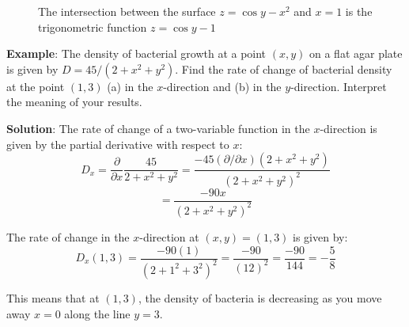 \begin{figure}[htbp]
    \centering
    \caption{The intersection between the surface $z = \cos{y} - x^2$ and 
    $x = 1$ is the trigonometric function $z = \cos{y} - 1$}
    \label{fig:ytangent}
\end{figure}

\textbf{Example}: The density of bacterial growth at a point $(x, y)$ on a 
flat agar plate is given by $D = 45/\left(2 + x^2 + y^2 \right)$. Find the 
rate of change of bacterial density at the point $(1, 3)$ (a) in the 
$x$-direction and (b) in the $y$-direction. Interpret the meaning of your 
results. 

\textbf{Solution}: The rate of change of a two-variable function in the 
$x$-direction is given by the partial derivative with respect to $x$:
$$D_x = \frac{\partial}{\partial x} \frac{45}{2 + x^2 + y^2} = \frac{-45 
\left( \partial/\partial x \right) \left(2 + x^2 + y^2 \right)}{\left(2 + 
x^2 + y^2 \right)^2}$$
$$= \frac{-90x}{\left( 2 + x^2 + y^2 \right)^2}$$

The rate of change in the $x$-direction at $(x, y) = (1, 3)$ is given by:
$$D_x(1, 3) = \frac{-90(1)}{\left( 2 + 1^2 + 3^2 \right)^2} = \frac{-90}{\left(
12 \right)^2} = \frac{-90}{144} = -\frac{5}{8}$$

This means that at $(1, 3)$, the density of bacteria is decreasing as you move 
away $x = 0$ along the line $y = 3$.

